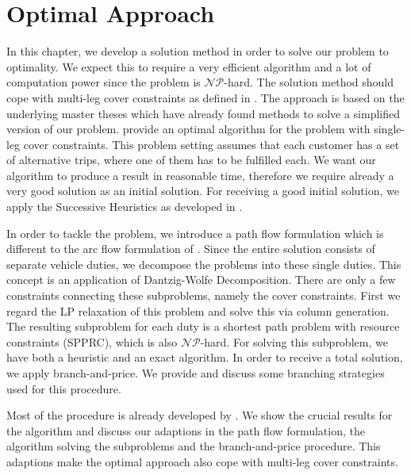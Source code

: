 \chapter{Optimal Approach}

In this chapter, we develop a solution method in order to solve our problem to optimality. We expect this to require a very efficient algorithm and a lot of computation power since the problem is $\mathcal{NP}$-hard. The solution method should cope with multi-leg cover constraints as defined in . The approach is based on the underlying master theses which have already found methods to solve a simplified version of our problem. \cite{Kaiser} provide an optimal algorithm for the problem with single-leg cover constraints. This problem setting assumes that each customer has a set of alternative trips, where one of them has to be fulfilled each. We want our algorithm to produce a result in reasonable time, therefore we require already a very good solution as an initial solution. For receiving a good initial solution, we apply the Successive Heuristics as developed in .

In order to tackle the problem, we introduce a path flow formulation which is different to the arc flow formulation of . Since the entire solution consists of separate vehicle duties, we decompose the problems into these single duties. This concept is an application of Dantzig-Wolfe Decomposition. There are only a few constraints connecting these subproblems, namely the cover constraints. First we regard the LP relaxation of this problem and solve this via column generation. The resulting subproblem for each duty is a shortest path problem with resource constraints (SPPRC), which is also $\mathcal{NP}$-hard. For solving this subproblem, we have both a heuristic and an exact algorithm. In order to receive a total solution, we apply branch-and-price. We provide and discuss some branching strategies used for this procedure.

Most of the procedure is already developed by \cite{Kaiser}. We show the crucial results for the algorithm and discuss our adaptions in the path flow formulation, the algorithm solving the subproblems and the branch-and-price procedure. This adaptions make the optimal approach also cope with multi-leg cover constraints.


